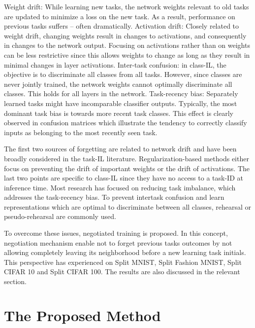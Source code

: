 \documentclass{article}
\begin{document}
 Weight drift: While learning new tasks, the network
weights relevant to old tasks are updated to minimize
a loss on the new task. As a result, performance on
previous tasks suffers – often dramatically. 
Activation drift: Closely related to weight drift, changing weights result in changes to activations, and consequently in changes to the network output. Focusing on
activations rather than on weights can be less restrictive
since this allows weights to change as long as they
result in minimal changes in layer activations. 
Inter-task confusion: in class-IL, the objective is to
discriminate all classes from all tasks. However, since
classes are never jointly trained, the network weights
cannot optimally discriminate all classes. 
This holds for all layers in the network. 
Task-recency bias: Separately learned tasks might have
incomparable classifier outputs. Typically, the most
dominant task bias is towards more recent task classes.
This effect is clearly observed in confusion matrices
which illustrate the tendency to correctly classify inputs as
belonging to the most recently seen task.

The first two sources of forgetting are related to network
drift and have been broadly considered in the task-IL literature. Regularization-based methods either focus on preventing the drift of important weights or
the drift of activations. The last two points are specific to class-IL since they
have no access to a task-ID at inference time. Most research
has focused on reducing task imbalance,
which addresses the task-recency bias. To prevent intertask confusion and learn representations which are optimal
to discriminate between all classes, rehearsal or
pseudo-rehearsal are commonly used.

To overcome these issues, negotiated training is proposed. In this concept, negotiation mechanism enable not to forget previous tasks outcomes by not allowing completely leaving its neighborhood before a new learning task initials. This perspective has experienced on Split MNIST, Split Fashion MNIST, Split CIFAR 10 and Split CIFAR 100. The results are also discussed in the relevant section.

\section{The Proposed Method}
\end{document}
